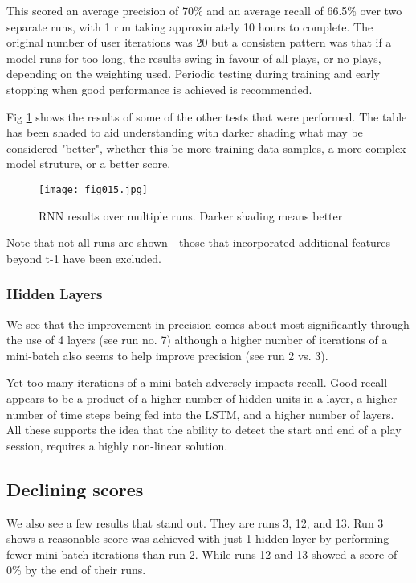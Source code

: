 This scored an average precision of 70\% and an average recall of 66.5\% over two separate runs, with 1 run taking approximately 10 hours to complete. The original number of user iterations was 20 but a consisten pattern was that if a model runs for too long, the results swing in favour of all plays, or no plays, depending on the weighting used. Periodic testing during training and early stopping when good performance is achieved is recommended.

Fig \ref{fig15} shows the results of some of the other tests that were performed. The table has been shaded to aid understanding with darker shading what may be considered "better", whether this be more training data samples, a more complex model struture, or a better score.

\begin{figure}[h!]
	\centering
	\texttt{[image: fig015.jpg]}
	\caption{RNN results over multiple runs. Darker shading means better}
	\label{fig15}
\end{figure}

Note that not all runs are shown - those that incorporated additional features beyond t-1 have been excluded.

\subsubsection{Hidden Layers}

We see that the improvement in precision comes about most significantly through the use of 4 layers (see run no. 7) although a higher number of iterations of a mini-batch also seems to help improve precision (see run 2 vs. 3). 

Yet too many iterations of a mini-batch adversely impacts recall. Good recall appears to be a product of a higher number of hidden units in a layer, a higher number of time steps being fed into the LSTM, and a higher number of layers. All these supports the idea that the ability to detect the start and end of a play session, requires a highly non-linear solution.
 
\subsection{Declining scores}

We also see a few results that stand out. They are runs 3, 12, and 13. Run 3 shows a reasonable score was achieved with just 1 hidden layer by performing fewer mini-batch iterations than run 2. While runs 12 and 13 showed a score of 0\% by the end of their runs.


